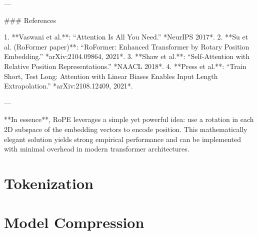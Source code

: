 ---

### References

1. **Vaswani et al.**: “Attention Is All You Need.” *NeurIPS 2017*.  
2. **Su et al. (RoFormer paper)**: “RoFormer: Enhanced Transformer by Rotary Position Embedding.” *arXiv:2104.09864, 2021*.  
3. **Shaw et al.**: “Self-Attention with Relative Position Representations.” *NAACL 2018*.  
4. **Press et al.**: “Train Short, Test Long: Attention with Linear Biases Enables Input Length Extrapolation.” *arXiv:2108.12409, 2021*.  

---

**In essence**, RoPE leverages a simple yet powerful idea: use a rotation in each 2D subspace of the embedding vectors to encode position. This mathematically elegant solution yields strong empirical performance and can be implemented with minimal overhead in modern transformer architectures.



\chapter{Tokenization}
\label{ch:transformer:tokenization}

\chapter{Model Compression}
\label{ch:transformer:compression}


